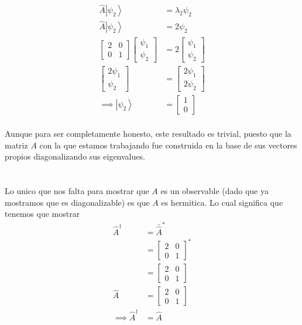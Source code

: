 \documentclass{report}
\begin{document}
\begin{align*}
	\hat{A}\left| \psi_2 \right> &= \lambda_2 \psi_2\\
	\hat{A}\left| \psi_2 \right> &=  2 \psi_2\\
	\begin{bmatrix}
		2 & 0 \\
		0 & 1
	\end{bmatrix}
	\begin{bmatrix}
		\psi_1 \\
		\psi_2
	\end{bmatrix}
	&= 2\begin{bmatrix}
		\psi_1 \\
		\psi_2
	\end{bmatrix}\\
	\begin{bmatrix}
		2 \psi_1 \\
		\psi_2
	\end{bmatrix}
	&= \begin{bmatrix}
		2\psi_1 \\
		2\psi_2
	\end{bmatrix}\\
	\implies \left| \psi_2 \right> &= \begin{bmatrix} 1 \\ 0 \end{bmatrix}\\
\end{align*}

Aunque para ser completamente honesto, este resultado es trivial, puesto que la matriz $A$ con la que estamos trabajando fue construida en la base de sus vectores propios diagonalizando sus eigenvalues.


\section{}

Lo unico que nos falta para mostrar que $A$ es un observable (dado que ya mostramos que es diagonalizable) es que $A$ es hermitica. Lo cual significa que tenemos que mostrar
\begin{align}
	\hat{A}^\dagger &= \bar{\hat{A}}^*\\
	&= \begin{bmatrix}
		2 & 0 \\
		0 & 1
	\end{bmatrix}^*\\
	&= \begin{bmatrix}
		2 & 0 \\
		0 & 1
	\end{bmatrix}\\
	\hat{A} &= \begin{bmatrix}
		2 & 0 \\
		0 & 1
	\end{bmatrix}\\
	\implies \hat{A}^\dagger &= \hat{A}
\end{align}
\end{document}
